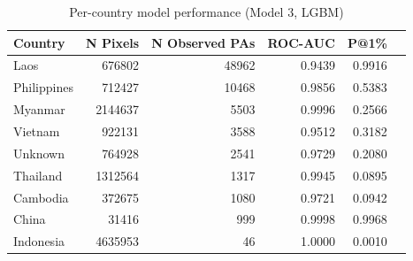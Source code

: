 \begin{table}[h]
\centering
\begin{tabular}{lrrrrr}
\toprule
Country & N Pixels & N Observed PAs & ROC-AUC & P@1\% \\
\midrule
Laos & 676802 & 48962 & 0.9439 & 0.9916 \\
Philippines & 712427 & 10468 & 0.9856 & 0.5383 \\
Myanmar & 2144637 & 5503 & 0.9996 & 0.2566 \\
Vietnam & 922131 & 3588 & 0.9512 & 0.3182 \\
Unknown & 764928 & 2541 & 0.9729 & 0.2080 \\
Thailand & 1312564 & 1317 & 0.9945 & 0.0895 \\
Cambodia & 372675 & 1080 & 0.9721 & 0.0942 \\
China & 31416 & 999 & 0.9998 & 0.9968 \\
Indonesia & 4635953 & 46 & 1.0000 & 0.0010 \\
\bottomrule
\end{tabular}
\caption{Per-country model performance (Model 3, LGBM)}
\label{tab:country_breakdown_lgbm}
\end{table}
